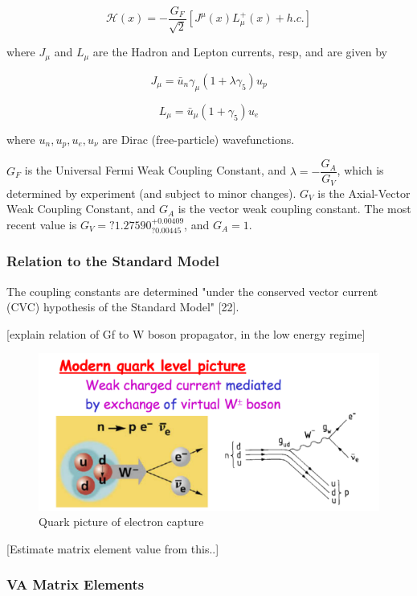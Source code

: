 \documentclass[11pt]{amsart}
\begin{document}
$$\mathcal{H}(x)=-\dfrac{G_{F}}{\sqrt{2}}\left[J^{\mu}(x)L^{+}_{\mu}(x)+h.c.\right]$$

where $J_{\mu}$ and $L_{\mu}$ are the Hadron and Lepton currents, resp, and are given by

$$J_{\mu}=\bar{u}_{n}\gamma_{\mu}(1+\lambda\gamma_{5})u_{p}$$

$$L_{\mu}=\bar{u}_{\mu}(1+\gamma_{5})u_{e}$$

where $u_{n},u_{p},u_{e},u_{\nu}$ are Dirac (free-particle) wavefunctions.

$G_{F}$ is the Universal Fermi Weak Coupling Constant, and $\lambda=-\dfrac{G_{A}}{G_{V}}$, which is determined by experiment (and subject to minor changes). 
 $G_{V}$ is the Axial-Vector Weak Coupling Constant, and $G_{A}$ is the vector weak coupling
constant.  The most recent value is $G_{V}=?1.27590^{+0.00409}_{?0.00445}$, and $G_{A}=1$.

\subsubsection{Relation to the Standard Model}

The coupling constants are determined "under the conserved vector current (CVC) hypothesis of the Standard Model" [22].

[explain relation of Gf to W boson propagator, in the low energy regime]
\begin{figure}
   \includegraphics[scale=0.5]{img/standard-model.png}
   \caption{Quark picture of electron capture}
  \label{fig:ec1}
\end{figure}

[Estimate matrix element value from this..]





\subsubsection{VA Matrix Elements}
\end{document}
